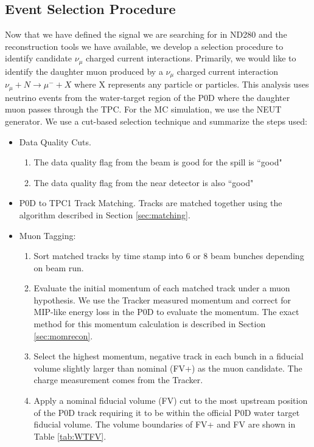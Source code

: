 \subsection{Event Selection Procedure}
\label{sec:selection}

Now that we have defined the signal we are searching for in ND280 and the reconstruction tools we have available, we develop a selection procedure to identify candidate $\nu_\mu$ charged current interactions. Primarily, we would like to identify the daughter muon produced by a $\nu_\mu$ charged current interaction $\nu_\mu + N \rightarrow \mu^- + X$ where X represents any particle or particles. This analysis uses neutrino events from the water-target region of the P0D where the daughter muon passes through the TPC. For the MC simulation, we use the NEUT generator. We use a cut-based selection technique and summarize the steps used:

\begin{itemize}
\item Data Quality Cuts.
\begin{enumerate}
	\item The data quality flag from the beam is good for the spill is ``good"
	\item The data quality flag from the near detector is also ``good"
\end{enumerate}
\item P0D to TPC1 Track Matching. Tracks are matched together using the algorithm described in Section \ref{sec:matching}.
\item Muon Tagging:
\begin{enumerate}
	\item Sort matched tracks by time stamp into 6 or 8 beam bunches depending on beam run.
	\item Evaluate the initial momentum of each matched track under a muon hypothesis. We use the Tracker measured momentum and correct for MIP-like energy loss in the P0D to evaluate the momentum. The exact method for this momentum calculation is described in Section \ref{sec:momrecon}.
	\item Select the highest momentum, negative track in each bunch in a fiducial volume slightly larger than nominal (FV+) as the muon candidate. The charge measurement comes from the Tracker. 
	\item Apply a nominal fiducial volume (FV) cut to the most upstream position of the P0D track requiring it to be within the official P0D water target fiducial volume. The volume boundaries of FV+ and FV are shown in Table \ref{tab:WTFV}.
\end{enumerate}
\end{itemize}

